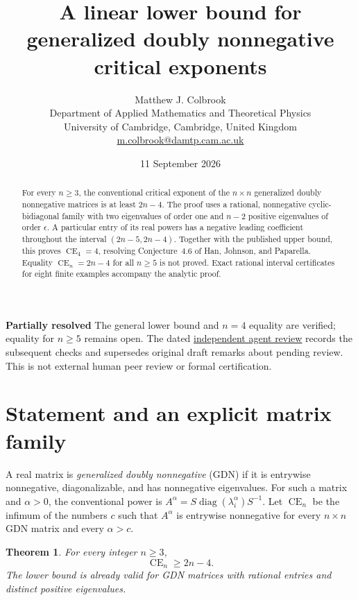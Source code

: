 \documentclass[11pt]{article}
\title{A linear lower bound for generalized doubly nonnegative critical exponents}
\author{Matthew J. Colbrook\\\small Department of Applied Mathematics and Theoretical Physics\\\small University of Cambridge, Cambridge, United Kingdom\\\small\href{mailto:m.colbrook@damtp.cam.ac.uk}{m.colbrook@damtp.cam.ac.uk}}
\date{11 September 2026}
\newtheorem{theorem}{Theorem}
\newcommand{\CE}{\operatorname{CE}}
\newcommand{\diag}{\operatorname{diag}}
\begin{document}
\maketitle

\noindent\textbf{Partially resolved} The general lower bound and $n=4$ equality are verified; equality for $n\ge5$ remains open.
The dated \href{https://github.com/MColbrook/OpenProblemsInNLA/blob/codex/colbrook-matrix-function-resolutions/references/colbrook-matrix-functions-2026-09-11/verification/reviews/MF-15-review.md}{independent agent review} records the subsequent checks and supersedes original draft remarks about pending review. This is not external human peer review or formal certification.
\par\medskip

\begin{abstract}
For every $n\ge3$, the conventional critical exponent of the $n\times n$ generalized doubly nonnegative matrices is at least $2n-4$. The proof uses a rational, nonnegative cyclic-bidiagonal family with two eigenvalues of order one and $n-2$ positive eigenvalues of order $\epsilon$. A particular entry of its real powers has a negative leading coefficient throughout the interval $(2n-5,2n-4)$. Together with the published upper bound, this proves $\CE_4=4$, resolving Conjecture~4.6 of Han, Johnson, and Paparella. Equality $\CE_n=2n-4$ for all $n\ge5$ is not proved. Exact rational interval certificates for eight finite examples accompany the analytic proof.
\end{abstract}

\section{Statement and an explicit matrix family}
A real matrix is \emph{generalized doubly nonnegative} (GDN) if it is entrywise nonnegative, diagonalizable, and has nonnegative eigenvalues. For such a matrix and $\alpha>0$, the conventional power is $A^\alpha=S\diag(\lambda_i^\alpha)S^{-1}$. Let $\CE_n$ be the infimum of the numbers $c$ such that $A^\alpha$ is entrywise nonnegative for every $n\times n$ GDN matrix and every $\alpha>c$.

\begin{theorem}\label{thm:lower}
For every integer $n\ge3$,
\[
\CE_n\ge 2n-4.
\]
The lower bound is already valid for GDN matrices with rational entries and distinct positive eigenvalues.
\end{theorem}
\end{document}
